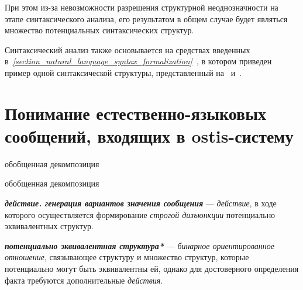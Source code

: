 При этом из-за невозможности разрешения структурной неоднозначности на этапе синтаксического анализа, его результатом в общем случае будет являться множество потенциальных синтаксических структур.

Синтаксический анализ также основывается на средствах введенных в~\textit{\ref{section_natural_language_syntax_formalization}~}, в котором приведен пример одной синтаксической структуры, представленный на~\textit{} и~\textit{}.

\section{Понимание естественно-языковых сообщений, входящих в ostis-систему}
\label{section_natural_language_messages_understanding}

\begin{SCn}

    \begin{scnrelfromset}{обобщенная декомпозиция}
        \begin{scnindent}
            \begin{scnrelfromset}{обобщенная декомпозиция}
            \end{scnrelfromset}
        \end{scnindent}
    \end{scnrelfromset}

\end{SCn}

\textbf{\textit{действие. генерация вариантов значения сообщения}} --- \textit{действие}, в ходе которого осуществляется формирование \textit{строгой дизъюнкции} потенциально эквивалентных структур.

\textbf{\textit{потенциально эквивалентная структура*}} --- \textit{бинарное ориентированное отношение}, связывающее структуру и множество структур, которые потенциально могут быть эквивалентны ей, однако для достоверного определения факта требуются дополнительные \textit{действия}.

